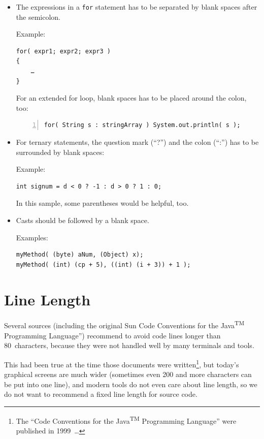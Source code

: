 \documentclass[11pt,a4paper, titlepage, parskip=half, headsepline, footsepline, cleardoublepage=current, headheight=1cm]{scrbook}
\begin{document}
\begin{itemize}
{Example:
\begin{lstlisting}[numbers=left]
a += c + d;
a = (a + b) / (c * d);

while( d-- > s++ )
{
    ++n;
}

printSize( "size is " + foo + "\n" );
\end{lstlisting}}
\item{The expressions in a \lstinline|for| statement has to be separated by blank spaces after the semicolon.

Example:
\begin{lstlisting}
for( expr1; expr2; expr3 )
{
    …
}
\end{lstlisting}

For an extended for loop, blank spaces has to be placed around the colon, too:
\begin{lstlisting}[numbers=left]
for( String s : stringArray ) System.out.println( s );
\end{lstlisting}}
\item{For ternary statements, the question mark (“?”) and the colon (“:”) has to be surrounded by blank spaces:

Example:
\begin{lstlisting}
int signum = d < 0 ? -1 : d > 0 ? 1 : 0;
\end{lstlisting}

In this sample, some parentheses would be helpful, too.}
\item{Casts should be followed by a blank space. 

Examples:
\begin{lstlisting}
myMethod( (byte) aNum, (Object) x);
myMethod( (int) (cp + 5), ((int) (i + 3)) + 1 );
\end{lstlisting}}
\end{itemize}


\section{Line Length}\label{sec:LineLength}
Several sources (including the original Sun Code Conventions for the Java\textsuperscript{TM} Programming Language”\autocite{SUN_CODE_CONVENTIONS:LineLength}) recommend to avoid code lines longer than 80~characters, because they were not handled well by many terminals and tools.

This had been true at the time those documents were written\footnote{The “Code Conventions for the Java\textsuperscript{TM} Programming Language”\autocite{SUN_CODE_CONVENTIONS} were published in 1999~…}, but today's  graphical screens are much wider (sometimes even 200 and more characters can be put into one line), and modern tools do not even care about line length, so we do not want to recommend a fixed line length for source code.
\end{document}
